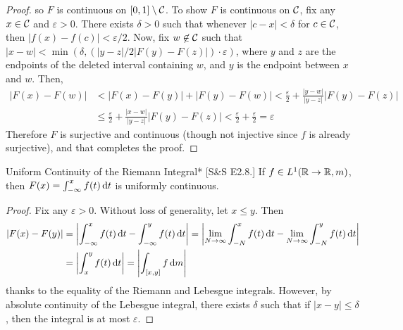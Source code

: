 \begin{proof}
    so \(F\) is continuous on \([0,1] \setminus \mathcal{C}\). To show \(F\) is continuous on \(\mathcal{C}\), fix any \(x \in \mathcal{C}\) and \(\varepsilon > 0\). There exists \(\delta > 0\) such that whenever \(|c - x| < \delta\) for \(c \in \mathcal{C}\), then \(|f(x) - f(c)| < \varepsilon / 2\). Now, fix \(w \not\in \mathcal{C}\) such that \(|x - w| < \min(\delta, (|y - z| / 2|F(y) - F(z)|) \cdot \varepsilon)\), where \(y\) and \(z\) are the endpoints of the deleted interval containing \(w\), and \(y\) is the endpoint between \(x\) and \(w\). Then, 
    \begin{align*}
        |F(x) - F(w)|
        &< |F(x) - F(y)| + |F(y) - F(w)|
        < \frac{\varepsilon}{2} + \frac{|y - w|}{|y - z|} |F(y) - F(z)| \\
        &\leq \frac{\varepsilon}{2} + \frac{|x -w|}{|y - z|} |F(y) - F(z)|
        < \frac{\varepsilon}{2} + \frac{\varepsilon}{2} 
        = \varepsilon
    \end{align*}
    Therefore \(F\) is surjective and continuous (though not injective since \(f\) is already surjective), and that completes the proof. 
\end{proof}

\begin{problem}{Uniform Continuity of the Riemann Integral}*
    [S\&S E2.8.] If \(f \in L^1(\mathbb{R} \to \mathbb{R}, m)\), then \(F(x) = \int_{-\infty}^x f(t) \, \mathrm{d}t\) is uniformly continuous.
\end{problem}

\begin{proof}
    Fix any \(\varepsilon > 0\). Without loss of generality, let \(x \leq y\). Then
    \begin{align*}
        |F(x) - F(y)| 
        &= \left| \int_{-\infty}^x f(t) \, \mathrm{d}t - \int_{-\infty}^y f(t) \, \mathrm{d}t \right| 
        = \left| \lim_{N \to \infty} \int_{-N}^x f(t) \,\mathrm{d}t - \lim_{N \to \infty} \int_{-N}^y f(t) \, \mathrm{d}t \right|  \\
        &= \left| \int_x^y f(t) \, \mathrm{d}t \right| 
        = \left| \int_{[x, y]} f \, \mathrm{d} m \right| 
    \end{align*}
    thanks to the equality of the Riemann and Lebesgue integrals. However, by absolute continuity of the Lebesgue integral, there exists \(\delta\) such that if \(|x - y| \leq \delta\), then the integral is at most \(\varepsilon\).
\end{proof}

